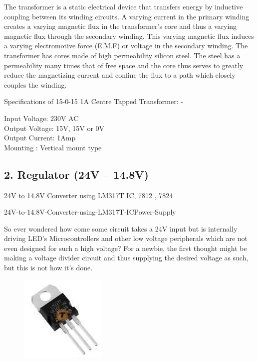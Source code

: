 \documentclass[twocolumn]{article}
\begin{document}
\noindent The transformer is a static electrical device that 
transfers energy by inductive coupling between 
its winding circuits. A varying current in the 
primary winding creates a varying magnetic 
flux in the transformer's core and thus a varying 
magnetic flux through the secondary winding. 
This varying magnetic flux induces a varying 
electromotive force (E.M.F) or voltage in the 
secondary winding. The transformer has cores 
made of high 
permeability silicon 
steel. The steel has a 
permeability many 
times that of free 
space and the core 
thus serves to greatly 
reduce the 
magnetizing current and confine the flux to a 
path which closely couples the winding.
\vspace{5pt}

\noindent Specifications of 15-0-15 1A Centre Tapped Transformer: - 

\noindent Input Voltage: 230V AC \\
Output Voltage: 15V, 15V or 0V \\
Output Current: 1Amp \\ 
Mounting : Vertical mount type \\

\subsection*{2. Regulator (24V – 14.8V)}
24V to 14.8V Converter using LM317T IC, 7812 , 7824 
\vspace{1pt}

\noindent 24V-to-14.8V-Converter-using-LM317T-ICPower-Supply
\vspace{5pt}

\noindent So ever wondered how come some circuit takes 
a 24V input but is internally driving LED’s 
Microcontrollers and other low voltage 
peripherals which are not even designed for 
such a high voltage? For a newbie, the first 
thought might be 
making a voltage 
divider circuit and thus 
supplying the desired 
voltage as such, but this 
is not how it’s done.
\vspace{1pt}

\begin{figure}[h]
    \centering
    \includegraphics{2.png}
    \label{fig:enter-label}
\end{figure}
\end{document}
